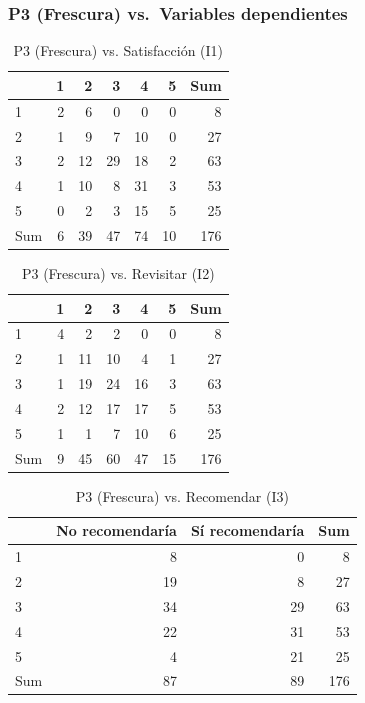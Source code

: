 \documentclass[
  spanish,
]{article}
\begin{document}
\subsubsection{P3 (Frescura) vs.~Variables
dependientes}\label{p3-frescura-vs.-variables-dependientes}

\begin{longtable}[t]{lrrrrrr}
\caption{\label{tab:cont-p3-satisf}P3 (Frescura) vs. Satisfacción (I1)}\\
\toprule
 & 1 & 2 & 3 & 4 & 5 & Sum\\
\midrule
1 & 2 & 6 & 0 & 0 & 0 & 8\\
2 & 1 & 9 & 7 & 10 & 0 & 27\\
3 & 2 & 12 & 29 & 18 & 2 & 63\\
4 & 1 & 10 & 8 & 31 & 3 & 53\\
5 & 0 & 2 & 3 & 15 & 5 & 25\\
\addlinespace
Sum & 6 & 39 & 47 & 74 & 10 & 176\\
\bottomrule
\end{longtable}

\begin{longtable}[t]{lrrrrrr}
\caption{\label{tab:cont-p3-revis}P3 (Frescura) vs. Revisitar (I2)}\\
\toprule
 & 1 & 2 & 3 & 4 & 5 & Sum\\
\midrule
1 & 4 & 2 & 2 & 0 & 0 & 8\\
2 & 1 & 11 & 10 & 4 & 1 & 27\\
3 & 1 & 19 & 24 & 16 & 3 & 63\\
4 & 2 & 12 & 17 & 17 & 5 & 53\\
5 & 1 & 1 & 7 & 10 & 6 & 25\\
\addlinespace
Sum & 9 & 45 & 60 & 47 & 15 & 176\\
\bottomrule
\end{longtable}

\begin{longtable}[t]{lrrr}
\caption{\label{tab:cont-p3-recom}P3 (Frescura) vs. Recomendar (I3)}\\
\toprule
 & No recomendaría & Sí recomendaría & Sum\\
\midrule
1 & 8 & 0 & 8\\
2 & 19 & 8 & 27\\
3 & 34 & 29 & 63\\
4 & 22 & 31 & 53\\
5 & 4 & 21 & 25\\
\addlinespace
Sum & 87 & 89 & 176\\
\bottomrule
\end{longtable}
\end{document}
